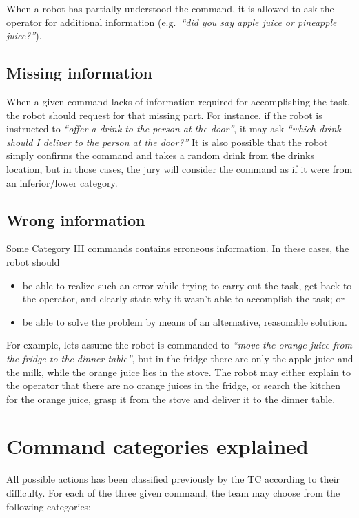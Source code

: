 When a robot has partially understood the command, it is allowed to ask the operator for additional information (e.g.~\textit{\enquote{did you say apple juice or pineapple juice?}}).

\subsection{Missing information}
When a given command lacks of information required for accomplishing the task, the robot should request for that missing part. For instance, if the robot is instructed to \textit{\enquote{offer a drink to the person at the door}}, it may ask \textit{\enquote{which drink should I deliver to the person at the door?}} It is also possible that the robot simply confirms the command and takes a random drink from the drinks location, but in those cases, the jury will consider the command as if it were from an inferior/lower category.

\subsection{Wrong information}
Some Category III commands contains erroneous information. In these cases, the robot should
\begin{itemize}
	\item be able to realize such an error while trying to carry out the task, get back to the operator, and clearly state why it wasn't able to accomplish the task; or
	\item be able to solve the problem by means of an alternative, reasonable solution.
\end{itemize}

For example, lets assume the robot is commanded to \textit{\enquote{move the orange juice from the fridge to the dinner table}}, but in the fridge there are only the apple juice and the milk, while the orange juice lies in the stove. The robot may either explain to the operator that there are no orange juices in the fridge, or search the kitchen for the orange juice, grasp it from the stove and deliver it to the dinner table.

\section{Command categories explained}
All possible actions has been classified previously by the TC according to their difficulty. For each of the three given command, the team may choose from the following categories:

